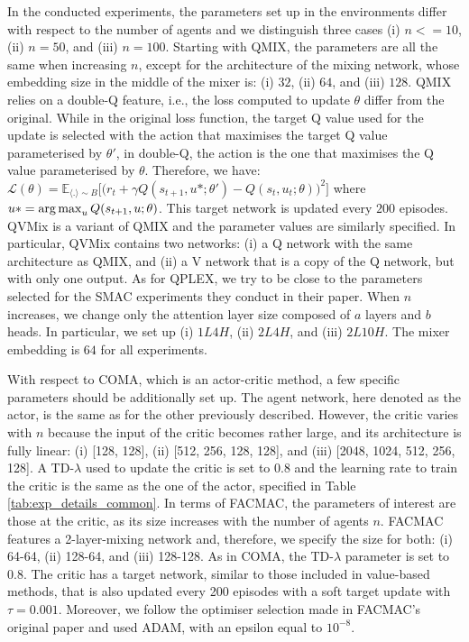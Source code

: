 In the conducted experiments, the parameters set up in the environments differ with respect to the number of agents and we distinguish three cases (i) $n<=10$, (ii) $n=50$, and (iii) $n=100$.
Starting with QMIX, the parameters are all the same when increasing $n$, except for the architecture of the mixing network, whose embedding size in the middle of the mixer is: (i) $32$, (ii) $64$, and (iii) $128$.
QMIX relies on a double-Q feature, i.e., the loss computed to update $\theta$ differ from the original.
While in the original loss function, the target Q value used for the update is selected with the action that maximises the target Q value parameterised by $\theta'$, in double-Q, the action is the one that maximises the Q value parameterised by $\theta$.
Therefore, we have: $\mathcal{L}(\theta) = \mathbb{E}_{\langle . \rangle\sim B} \big[\big(r_{t} + \gamma Q(s_{t+1}, u*; \theta')- Q(s_{t}, u_{t}; \theta)\big)^{2}\big]$ where $u*=\operatorname*{arg\,max}_u Q(s_{t+1}, u; \theta)$.
This target network is updated every $200$ episodes.
QVMix is a variant of QMIX and the parameter values are similarly specified.
In particular, QVMix contains two networks: (i) a Q network with the same architecture as QMIX, and (ii) a V network that is a copy of the Q network, but with only one output.
As for QPLEX, we try to be close to the parameters selected for the SMAC experiments they conduct in their paper.
When $n$ increases, we change only the attention layer size composed of $a$ layers and $b$ heads.
In particular, we set up (i) $1L4H$, (ii) $2L4H$, and (iii) $2L10H$.
The mixer embedding is $64$ for all experiments.

With respect to COMA, which is an actor-critic method, a few specific parameters should be additionally set up.
The agent network, here denoted as the actor, is the same as for the other previously described.
However, the critic varies with $n$ because the input of the critic becomes rather large, and its architecture is fully linear: (i) [128, 128], (ii) [512, 256, 128, 128], and (iii) [2048, 1024, 512, 256, 128].
A TD-$\lambda$ used to update the critic is set to $0.8$ and the learning rate to train the critic is the same as the one of the actor, specified in Table \ref{tab:exp_details_common}.
In terms of FACMAC, the parameters of interest are those at the critic, as its size increases with the number of agents $n$.
FACMAC features a 2-layer-mixing network and, therefore, we specify the size for both:
(i) 64-64, (ii) 128-64, and (iii) 128-128.
As in COMA, the TD-$\lambda$ parameter is set to $0.8$.
The critic has a target network, similar to those included in value-based methods, that is also updated every 200 episodes with a soft target update with $\tau=0.001$.
Moreover, we follow the optimiser selection made in FACMAC's original paper and used ADAM, with an epsilon equal to $10^{-8}$.

